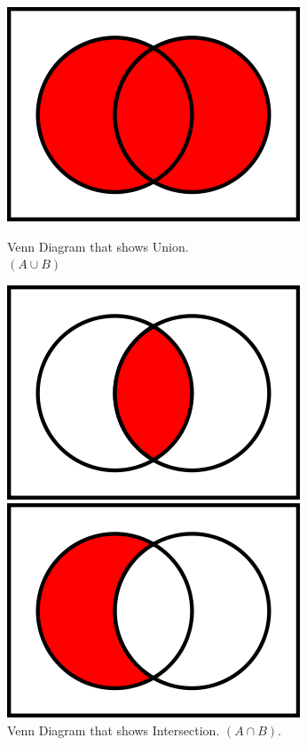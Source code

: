 \documentclass[../Latex-Setup/setup.tex]{subfiles}
\begin{document}
\begin{figure}[H]
    \begin{minipage}{0.45\textwidth}
    \centering
    \includegraphics[scale=0.45]{./images/Venn-Diagram-Union.png}
    \caption{Venn Diagram that shows Union. \\ $(A \cup B)$}
    \end{minipage}\hfill
    \begin{minipage}{0.45\textwidth}
        \centering
        \includegraphics[scale=0.45]{./images/Venn-Diagram-Intersection.png}
        \caption{Venn Diagram that shows Intersection. $(A \cap B)$.}
    \end{minipage}\hfill
    \begin{minipage}{0.45\textwidth}
        \centering
        \includegraphics[scale=0.45]{./images/Venn-Diagram-Difference.png}

\end{minipage}
\end{figure}
\end{document}
